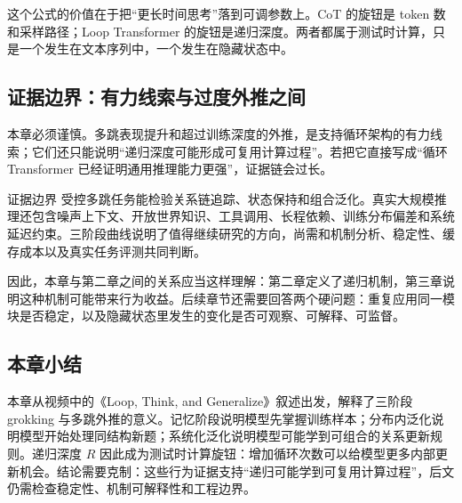 这个公式的价值在于把“更长时间思考”落到可调参数上。CoT 的旋钮是 token 数和采样路径；Loop Transformer 的旋钮是递归深度。两者都属于测试时计算，只是一个发生在文本序列中，一个发生在隐藏状态中。

\subsection{证据边界：有力线索与过度外推之间}

本章必须谨慎。多跳表现提升和超过训练深度的外推，是支持循环架构的有力线索；它们还只能说明“递归深度可能形成可复用计算过程”。若把它直接写成“循环 Transformer 已经证明通用推理能力更强”，证据链会过长。

\begin{warningbox}{证据边界}
受控多跳任务能检验关系链追踪、状态保持和组合泛化。真实大规模推理还包含噪声上下文、开放世界知识、工具调用、长程依赖、训练分布偏差和系统延迟约束。三阶段曲线说明了值得继续研究的方向，尚需和机制分析、稳定性、缓存成本以及真实任务评测共同判断。
\end{warningbox}

因此，本章与第二章之间的关系应当这样理解：第二章定义了递归机制，第三章说明这种机制可能带来行为收益。后续章节还需要回答两个硬问题：重复应用同一模块是否稳定，以及隐藏状态里发生的变化是否可观察、可解释、可监督。

\subsection{本章小结}

本章从视频中的《Loop, Think, and Generalize》叙述出发，解释了三阶段 grokking 与多跳外推的意义。记忆阶段说明模型先掌握训练样本；分布内泛化说明模型开始处理同结构新题；系统化泛化说明模型可能学到可组合的关系更新规则。递归深度 \(R\) 因此成为测试时计算旋钮：增加循环次数可以给模型更多内部更新机会。结论需要克制：这些行为证据支持“递归可能学到可复用计算过程”，后文仍需检查稳定性、机制可解释性和工程边界。
